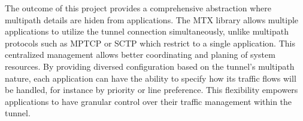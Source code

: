 \documentclass{article} %
\begin{document}
The outcome of this project provides a comprehensive abstraction where multipath details are hiden from applications.
The MTX library allows multiple applications to utilize the tunnel connection simultaneously, unlike multipath protocols such as MPTCP or SCTP which restrict to a single application.
This centralized management allows better coordinating and planing of system resources.
By providing diversed configuration based on the tunnel's multipath nature, each application can have the ability to specify how its traffic flows will be handled, for instance by priority or line preference. This flexibility empowers applications to have granular control over their traffic management within the tunnel.
\\
\end{document}
